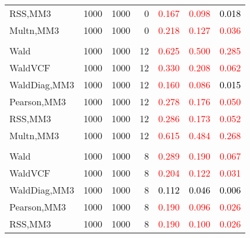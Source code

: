 \documentclass[
]{article}
\begin{document}
\begin{table}[H]
{\begin{tabular}[t]{lrrrrrr}
\hspace{1em}RSS,MM3 & 1000 & 1000 & 0 & \textcolor{red}{0.167} & \textcolor{red}{0.098} & \textcolor{black}{0.018}\\
\hspace{1em}Multn,MM3 & 1000 & 1000 & 0 & \textcolor{red}{0.218} & \textcolor{red}{0.127} & \textcolor{red}{0.036}\\
\addlinespace[0.3em]
\multicolumn{7}{l}{\textbf{1F 15V}}\\
\hspace{1em}Wald & 1000 & 1000 & 12 & \textcolor{red}{0.625} & \textcolor{red}{0.500} & \textcolor{red}{0.285}\\
\hspace{1em}WaldVCF & 1000 & 1000 & 12 & \textcolor{red}{0.330} & \textcolor{red}{0.208} & \textcolor{red}{0.062}\\
\hspace{1em}WaldDiag,MM3 & 1000 & 1000 & 12 & \textcolor{red}{0.160} & \textcolor{red}{0.086} & \textcolor{black}{0.015}\\
\hspace{1em}Pearson,MM3 & 1000 & 1000 & 12 & \textcolor{red}{0.278} & \textcolor{red}{0.176} & \textcolor{red}{0.050}\\
\hspace{1em}RSS,MM3 & 1000 & 1000 & 12 & \textcolor{red}{0.286} & \textcolor{red}{0.173} & \textcolor{red}{0.052}\\
\hspace{1em}Multn,MM3 & 1000 & 1000 & 12 & \textcolor{red}{0.615} & \textcolor{red}{0.484} & \textcolor{red}{0.268}\\
\addlinespace[0.3em]
\multicolumn{7}{l}{\textbf{2F 10V}}\\
\hspace{1em}Wald & 1000 & 1000 & 8 & \textcolor{red}{0.289} & \textcolor{red}{0.190} & \textcolor{red}{0.067}\\
\hspace{1em}WaldVCF & 1000 & 1000 & 8 & \textcolor{red}{0.204} & \textcolor{red}{0.122} & \textcolor{red}{0.031}\\
\hspace{1em}WaldDiag,MM3 & 1000 & 1000 & 8 & \textcolor{black}{0.112} & \textcolor{black}{0.046} & \textcolor{black}{0.006}\\
\hspace{1em}Pearson,MM3 & 1000 & 1000 & 8 & \textcolor{red}{0.190} & \textcolor{red}{0.096} & \textcolor{red}{0.026}\\
\hspace{1em}RSS,MM3 & 1000 & 1000 & 8 & \textcolor{red}{0.190} & \textcolor{red}{0.100} & \textcolor{red}{0.026}\\

\end{tabular}}
\end{table}
\end{document}
